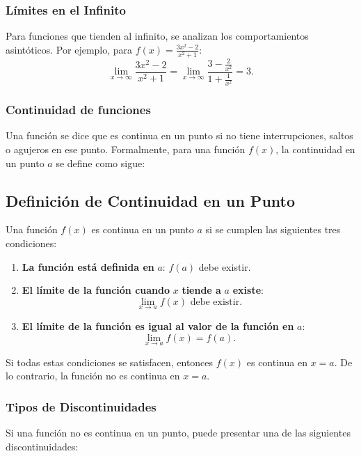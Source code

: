 \subsubsection{Límites en el Infinito}

Para funciones que tienden al infinito, se analizan los comportamientos asintóticos. Por ejemplo, para \( f(x) = \frac{3x^2 - 2}{x^2 + 1} \):
\[
\lim_{x \to \infty} \frac{3x^2 - 2}{x^2 + 1} = \lim_{x \to \infty} \frac{3 - \frac{2}{x^2}}{1 + \frac{1}{x^2}} = 3.
\]

\subsubsection{Continuidad de funciones}

Una función se dice que es continua en un punto si no tiene interrupciones, saltos o agujeros en ese punto. Formalmente, para una función \( f(x) \), la continuidad en un punto \( a \) se define como sigue:



\subsection{Definición de Continuidad en un Punto}

Una función \( f(x) \) es continua en un punto \( a \) si se cumplen las siguientes tres condiciones:

\begin{enumerate}
    \item \textbf{La función está definida en } \( a \): \( f(a) \) debe existir.
    \item \textbf{El límite de la función cuando } \( x \) \textbf{ tiende a } \( a \) \textbf{ existe}: \[
    \lim_{x \to a} f(x) \text{ debe existir.}
    \]
    \item \textbf{El límite de la función es igual al valor de la función en } \( a \): \[
    \lim_{x \to a} f(x) = f(a).
    \]
\end{enumerate}

Si todas estas condiciones se satisfacen, entonces \( f(x) \) es continua en \( x = a \). De lo contrario, la función no es continua en \( x = a \).

\subsubsection{Tipos de Discontinuidades}

Si una función no es continua en un punto, puede presentar una de las siguientes discontinuidades:

